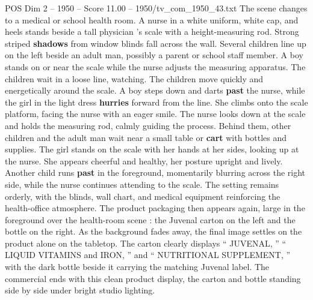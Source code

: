 \begin{textsample}{POS Dim 2 – 1950 – Score 11.00 – 1950/tv\_com\_1950\_43.txt}
The scene changes to a medical or school health room.
A nurse in a white uniform, white cap, and heels stands beside a tall physician ’s scale with a height-measuring rod.
Strong striped \textbf{shadows} from window blinds fall across the wall.
Several children line up on the left beside an adult man, possibly a parent or school staff member.
A boy stands on or near the scale while the nurse adjusts the measuring apparatus.
The children wait in a loose line, watching.
The children move quickly and energetically around the scale.
A boy steps down and darts \textbf{past} the nurse, while the girl in the light dress \textbf{hurries} forward from the line.
She climbs onto the scale platform, facing the nurse with an eager smile.
The nurse looks down at the scale and holds the measuring rod, calmly guiding the process.
Behind them, other children and the adult man wait near a small table or \textbf{cart} with bottles and supplies.
The girl stands on the scale with her hands at her sides, looking up at the nurse.
She appears cheerful and healthy, her posture upright and lively.
Another child runs \textbf{past} in the foreground, momentarily blurring across the right side, while the nurse continues attending to the scale.
The setting remains orderly, with the blinds, wall chart, and medical equipment reinforcing the health-office atmosphere.
The product packaging then appears again, large in the foreground over the health-room scene : the Juvenal carton on the left and the bottle on the right.
As the background fades away, the final image settles on the product alone on the tabletop.
The carton clearly displays “ JUVENAL, ” “ LIQUID VITAMINS and IRON, ” and “ NUTRITIONAL SUPPLEMENT, ” with the dark bottle beside it carrying the matching Juvenal label.
The commercial ends with this clean product display, the carton and bottle standing side by side under bright studio lighting.

\end{textsample}
